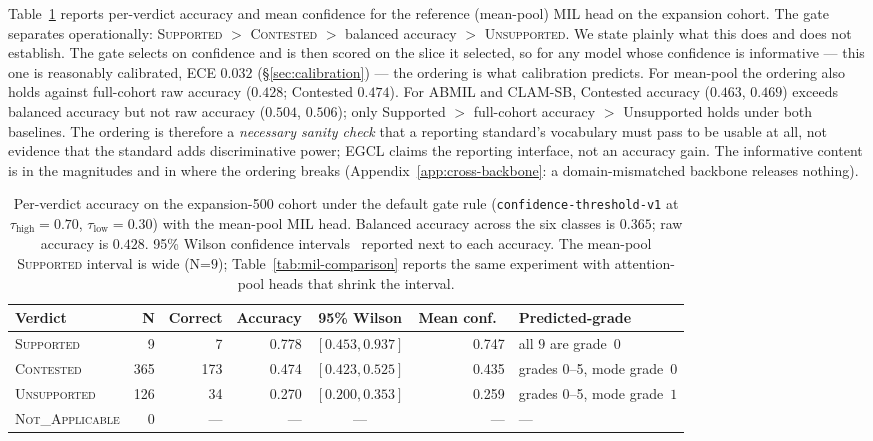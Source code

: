 \documentclass{article}
\newcommand{\SafeNum}[1]{#1}
\newcommand{\AggNum}[2]{#2}
\begin{document}
Table~\ref{tab:verdict-acc} reports per-verdict accuracy and mean confidence for the reference (mean-pool) MIL head on the expansion cohort. The gate separates operationally: \textsc{Supported} $>$ \textsc{Contested} $>$ balanced accuracy $>$ \textsc{Unsupported}. We state plainly what this does and does not establish. The gate selects on confidence and is then scored on the slice it selected, so for any model whose confidence is informative --- this one is reasonably calibrated, ECE $\SafeNum{0.032}$ (\S\ref{sec:calibration}) --- the ordering is what calibration predicts. For mean-pool the ordering also holds against full-cohort raw accuracy ($\SafeNum{0.428}$; Contested $\SafeNum{0.474}$). For ABMIL and CLAM-SB, Contested accuracy ($\AggNum{abmil.contested.acc}{0.463}$, $\AggNum{clam-sb.contested.acc}{0.469}$) exceeds balanced accuracy but not raw accuracy ($\AggNum{abmil.raw_accuracy}{0.504}$, $\AggNum{clam-sb.raw_accuracy}{0.506}$); only Supported $>$ full-cohort accuracy $>$ Unsupported holds under both baselines. The ordering is therefore a \emph{necessary sanity check} that a reporting standard's vocabulary must pass to be usable at all, not evidence that the standard adds discriminative power; EGCL claims the reporting interface, not an accuracy gain. The informative content is in the magnitudes and in where the ordering breaks (Appendix~\ref{app:cross-backbone}: a domain-mismatched backbone releases nothing).

\begin{table}[t]
\centering
\caption{Per-verdict accuracy on the expansion-500 cohort under the default gate rule (\texttt{confidence-threshold-v1} at $\tau_{\text{high}}=0.70$, $\tau_{\text{low}}=0.30$) with the mean-pool MIL head. Balanced accuracy across the six classes is $\SafeNum{0.365}$; raw accuracy is $\SafeNum{0.428}$. \SafeNum{95\%} Wilson confidence intervals~\citep{wilson1927} reported next to each accuracy. The mean-pool \textsc{Supported} interval is wide (N=$\SafeNum{9}$); Table~\ref{tab:mil-comparison} reports the same experiment with attention-pool heads that shrink the interval.}
\label{tab:verdict-acc}
\setlength{\tabcolsep}{4pt}
\small
\begin{tabular}{@{}lrrrcrl@{}}
\toprule
Verdict & N & Correct & Accuracy & \SafeNum{95\%} Wilson & Mean conf.\ & Predicted-grade\\
\midrule
\textsc{Supported}      & \SafeNum{9}   & \SafeNum{7}   & \SafeNum{0.778} & $[\SafeNum{0.453}, \SafeNum{0.937}]$ & \SafeNum{0.747} & all $\SafeNum{9}$ are grade~$\SafeNum{0}$ \\
\textsc{Contested}      & \SafeNum{365} & \SafeNum{173} & \SafeNum{0.474} & $[\SafeNum{0.423}, \SafeNum{0.525}]$ & \SafeNum{0.435} & grades 0--5, mode grade~$\SafeNum{0}$ \\
\textsc{Unsupported}    & \SafeNum{126} & \SafeNum{34}  & \SafeNum{0.270} & $[\SafeNum{0.200}, \SafeNum{0.353}]$ & \SafeNum{0.259} & grades 0--5, mode grade~$\SafeNum{1}$ \\
\textsc{Not\_Applicable}& \SafeNum{0}   & ---           & ---             & ---                 & ---             & --- \\
\bottomrule
\end{tabular}
\end{table}
\end{document}
